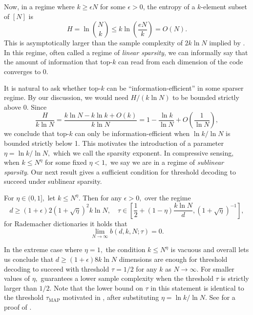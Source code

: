 Now, in a regime where $k \ge \epsilon N$ for some $\epsilon > 0$, the entropy of a $k$-element subset of $[N]$ is
$$
H = \ln \binom{N}{k} \le k \ln \left( \frac {eN} k \right) = O(N).
$$
This is asymptotically larger than the sample complexity of $2 k \ln N$ implied by . In this regime, often called a regime of \textit{linear sparsity}, we can informally say that the amount of information that top-$k$ can read from each dimension of the code converges to $0.$

It is natural to ask whether top-$k$ can be ``information-efficient'' in some sparser regime. By our discussion, we would need $H / (k \ln N)$ to be bounded strictly above $0.$ Since
$$
\frac{H} {k \ln N} = \frac{k \ln N - k \ln k + O(k)}{k \ln N} = 1 - \frac{\ln k} {\ln N} + O\left(\frac 1 {\ln N}\right),
$$
we conclude that top-$k$ can only be information-efficient when $\ln k / \ln N$ is bounded strictly below 1. This motivates the introduction of a parameter $\eta = \ln k / \ln N,$ which we call the sparsity exponent. In compressive sensing, when $k \le N^\eta$ for some fixed $\eta < 1,$ we say we are in a regime of \textit{sublinear sparsity}. Our next result gives a sufficient condition for threshold decoding to succeed under sublinear sparsity.

\begin{proposition}\label{prop:sufficient-cond}
    For $\eta \in (0, 1],$ let $k \le N^\eta.$ Then for any $\epsilon > 0,$ over the regime
	$$
	d \ge (1 + \epsilon) 2(1 + \sqrt \eta)^2 k \ln N, \quad \tau \in \left [\frac 1 2 + (1 - \eta) \frac{k \ln N} d, (1 + \sqrt \eta)^{-1} \right],
	$$
	for Rademacher dictionaries it holds that
	$$
	\lim_{N \to \infty} b(d, k, N; \tau) = 0.
	$$
\end{proposition}

In the extreme case where $\eta = 1,$ the condition $k \le N^\eta$ is vacuous and overall  lets us conclude that $d \ge (1 + \epsilon) 8 k \ln N$ dimensions are enough for threshold decoding to succeed with threshold $\tau = 1/2$ for any $k$ as $N \to \infty.$ For smaller values of $\eta,$  guarantees a lower sample complexity when the threshold $\tau$ is strictly larger than $1/2.$ Note that the lower bound on $\tau$ in this statement is identical to the threshold $\tau_\text{MAP}$ motivated in , after substituting $\eta = \ln k / \ln N.$ See  for a proof of .

